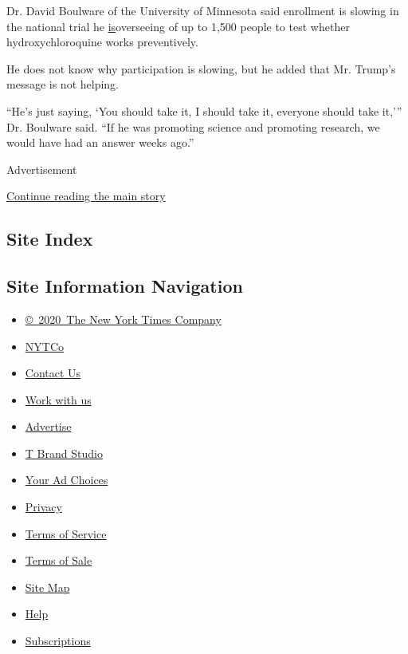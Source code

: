 Dr. David Boulware of the University of Minnesota said enrollment is
slowing in the national trial he
\href{https://med.umn.edu/news-events/covid-19-clinical-trial-launches-university-minnesota}{is}overseeing
of up to 1,500 people to test whether hydroxychloroquine works
preventively.

He does not know why participation is slowing, but he added that Mr.
Trump's message is not helping.

``He's just saying, `You should take it, I should take it, everyone
should take it,''' Dr. Boulware said. ``If he was promoting science and
promoting research, we would have had an answer weeks ago.''

Advertisement

\protect\hyperlink{after-bottom}{Continue reading the main story}

\hypertarget{site-index}{%
\subsection{Site Index}\label{site-index}}

\hypertarget{site-information-navigation}{%
\subsection{Site Information
Navigation}\label{site-information-navigation}}

\begin{itemize}
\tightlist
\item
  \href{https://help.nytimes.com/hc/en-us/articles/115014792127-Copyright-notice}{©~2020~The
  New York Times Company}
\end{itemize}

\begin{itemize}
\tightlist
\item
  \href{https://www.nytco.com/}{NYTCo}
\item
  \href{https://help.nytimes.com/hc/en-us/articles/115015385887-Contact-Us}{Contact
  Us}
\item
  \href{https://www.nytco.com/careers/}{Work with us}
\item
  \href{https://nytmediakit.com/}{Advertise}
\item
  \href{http://www.tbrandstudio.com/}{T Brand Studio}
\item
  \href{https://www.nytimes.com/privacy/cookie-policy\#how-do-i-manage-trackers}{Your
  Ad Choices}
\item
  \href{https://www.nytimes.com/privacy}{Privacy}
\item
  \href{https://help.nytimes.com/hc/en-us/articles/115014893428-Terms-of-service}{Terms
  of Service}
\item
  \href{https://help.nytimes.com/hc/en-us/articles/115014893968-Terms-of-sale}{Terms
  of Sale}
\item
  \href{https://spiderbites.nytimes.com}{Site Map}
\item
  \href{https://help.nytimes.com/hc/en-us}{Help}
\item
  \href{https://www.nytimes.com/subscription?campaignId=37WXW}{Subscriptions}
\end{itemize}

